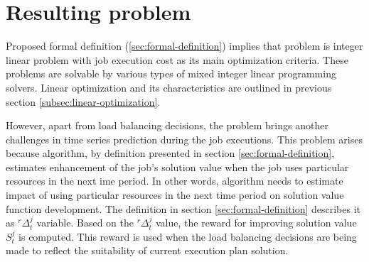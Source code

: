 \newpage
\section{Resulting problem}\label{sec:resulting-problem}
Proposed formal definition (\ref{sec:formal-definition}) implies that problem is 
integer linear problem with job execution cost as its main optimization criteria. 
These problems are solvable by various types of mixed integer linear programming solvers.
Linear optimization and its characteristics are outlined in previous section \ref{subsec:linear-optimization}.

However,
apart from load balancing decisions,
the problem brings another challenges in time series prediction during the job executions.
This problem arises because algorithm, by definition presented in section \ref{sec:formal-definition},
estimates enhancement of the job's solution value when the job uses particular resources in the next ime period.
In other words, 
algorithm needs to estimate impact of using particular resources in the next time period on solution value function development.
The definition in section \ref{sec:formal-definition} describes it as $^{r}\Delta_{t}^{j}$ variable.
Based on the $^{r}\Delta_{t}^{j}$ value, the reward for improving solution value $S_{t}^{j}$ is computed.
This reward is used when the load balancing decisions are being made to reflect the suitability of current execution plan solution.